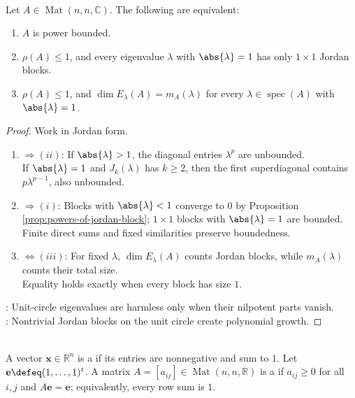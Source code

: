 \begin{theorem} \label{thm:matrix-power-bounded-jordan-criterion} \\
Let $A\in\operatorname{Mat}(n,n,\mathbb{C})$. The following are equivalent:
\begin{enumerate}[label=(\roman*)]
\setlength{\itemsep}{0pt}
\item $A$ is power bounded.
\item $\rho(A)\leq1$, and every eigenvalue $\lambda$ with $\abs{\lambda}=1$ has only $1\times1$ Jordan blocks.
\item $\rho(A)\leq1$, and $\dim E_{\lambda}(A)=m_A(\lambda)$ for every $\lambda\in\operatorname{spec}(A)$ with $\abs{\lambda}=1$.
\end{enumerate}
\begin{proof}
Work in Jordan form.
\begin{enumerate}[label=(\roman*)]
\setlength{\itemsep}{0pt}
\item[$(i)$]$\Rightarrow(ii)$: If $\abs{\lambda}>1$, the diagonal entries $\lambda^p$ are unbounded.\\
If $\abs{\lambda}=1$ and $J_k(\lambda)$ has $k\geq2$, then the first superdiagonal contains $p\lambda^{p-1}$, also unbounded.
\item[$(ii)$]$\Rightarrow(i)$: Blocks with $\abs{\lambda}<1$ converge to $0$ by Proposition \ref{prop:powers-of-jordan-block}; $1\times1$ blocks with $\abs{\lambda}=1$ are bounded. Finite direct sums and fixed similarities preserve boundedness.
\item[$(ii)$]$\Leftrightarrow(iii)$: For fixed $\lambda$, $\dim E_{\lambda}(A)$ counts Jordan blocks, while $m_A(\lambda)$ counts their total size.\\
Equality holds exactly when every block has size $1$.
\end{enumerate}
: Unit-circle eigenvalues are harmless only when their nilpotent parts vanish.\\
: Nontrivial Jordan blocks on the unit circle create polynomial growth.
\end{proof}
\end{theorem}

\begin{definition} \label{def:probability-vector-and-markov-matrix} \\
A vector $\mathbf{x}\in\mathbb{R}^n$ is a  if its entries are nonnegative and sum to $1$. Let $\mathbf{e}\defeq(1,\ldots,1)^t$. A matrix $A=[a_{ij}]\in\operatorname{Mat}(n,n,\mathbb{R})$ is a  if $a_{ij}\geq0$ for all $i,j$ and $A\mathbf{e}=\mathbf{e}$; equivalently, every row sum is $1$.
\end{definition}

